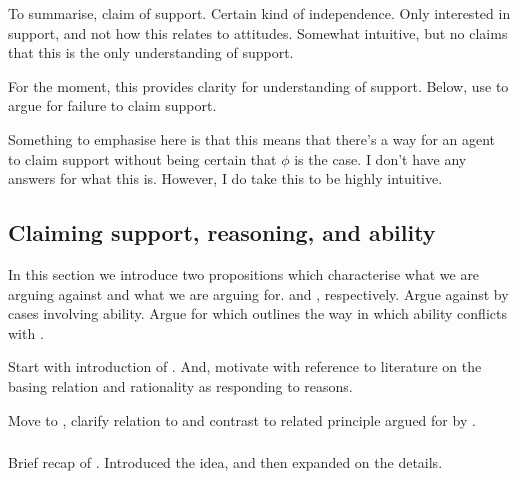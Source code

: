 \begin{note}
  To summarise, claim of support.
  Certain kind of independence.
  Only interested in support, and not how this relates to attitudes.
  Somewhat intuitive, but no claims that this is the only understanding of support.

  For the moment, this provides clarity for understanding of support.
  Below, use to argue for failure to claim support.
\end{note}

\begin{note}
  \color{red}
  Something to emphasise here is that this means that there's a way for an agent to claim support without being certain that \(\phi\) is the case.
  I don't have any answers for what this is.
  However, I do take this to be highly intuitive.
\end{note}

\subsection{Claiming support, reasoning, and ability}
\label{sec:inter-with-claim}

\begin{note}
  In this section we introduce two propositions which characterise what we are arguing against and what we are arguing for.
  \ESU{-} and \EAS{-}, respectively.
  Argue against \ESU{} by cases involving ability.
  Argue for \EAS{} which outlines the way in which ability conflicts with \ESU{}.

  Start with introduction of \ESU{}.
  And, motivate with reference to literature on the basing relation and rationality as responding to reasons.

  Move to \EAS{}, clarify relation to \ESU{} and contrast to related principle argued for by \citeauthor{Moretti:2019wx}.
\end{note}

\subsubsection{\ESU{}}
\label{sec:esu}

\begin{note}
  Brief recap of \USE{}.
  Introduced the idea, and then expanded on the details.
\end{note}

